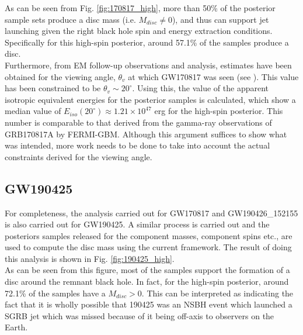     As can be seen from Fig. \ref{fig:170817_high}, more than 50\% of the posterior
    sample sets produce a disc mass (i.e. $M_{disc} \neq 0$), and thus can support jet
    launching given the right black hole spin and energy extraction conditions.
    Specifically for this high-spin posterior, around 57.1\% of the samples produce a
    disc.\\
    Furthermore, from EM follow-up observations and analysis, estimates have been
    obtained for the viewing angle, $\theta_v$ at which GW170817 was seen (see
    \cite{finstad_2018}). This value has been constrained to be $\theta_v \sim
    20^{\circ}$. Using this, the value of the apparent isotropic equivalent energies for
    the posterior samples is calculated, which show a median value of
    $E_{iso}(20^{\circ}) \approx 1.21 \times 10^{47}$ erg for the high-spin posterior.
    This number is comparable to that derived from the gamma-ray observations of
    GRB170817A by FERMI-GBM. Although this argument suffices to show what was intended,
    more work needs to be done to take into account the actual constraints derived
    for the viewing angle.

    \subsection{GW190425}\label{ssec:nsbh_190425}

        For completeness, the analysis carried out for GW170817 and GW190426\_152155 is
        also carried out for GW190425. A similar process is carried out and the
        posteriors samples released for the component masses, component spins etc., are
        used to compute the disc mass using the current framework. The result of doing
        this analysis is shown in Fig. \ref{fig:190425_high}.\\
        As can be seen from this figure, most of the samples support the formation of
        a disc around the remnant black hole. In fact, for the high-spin posterior,
        around 72.1\% of the samples have a $M_{disc} > 0$. This can be interpreted
        as indicating the fact that it is wholly possible that 190425 was an NSBH event
        which launched a SGRB jet which was missed because of it being off-axis to
        observers on the Earth.\\

